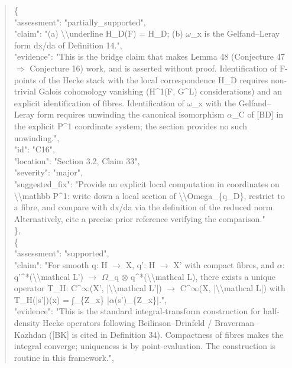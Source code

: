 \documentclass[11pt]{article}
\begin{document}
\begin{quote}
    \{\\
      "assessment": "partially\_supported",\\
      "claim": "(a) \textbackslash{}\textbackslash{}underline H\_D(F) = H\_D; (b) \ensuremath{\omega}\_x is the Gelfand--Leray form dx/da of Definition 14.",\\
      "evidence": "This is the bridge claim that makes Lemma 48 (Conjecture 47 \ensuremath{\Rightarrow} Conjecture 16) work, and is asserted without proof. Identification of F-points of the Hecke stack with the local correspondence H\_D requires non-trivial Galois cohomology vanishing (H\^{}1(F, G\^{}L) considerations) and an explicit identification of fibres. Identification of \ensuremath{\omega}\_x with the Gelfand--Leray form requires unwinding the canonical isomorphism \ensuremath{\alpha}\_C of [BD] in the explicit P\^{}1 coordinate system; the section provides no such unwinding.",\\
      "id": "C16",\\
      "location": "Section 3.2, Claim 33",\\
      "severity": "major",\\
      "suggested\_fix": "Provide an explicit local computation in coordinates on \textbackslash{}\textbackslash{}mathbb P\^{}1: write down a local section of \textbackslash{}\textbackslash{}Omega\_\{q\_D\}, restrict to a fibre, and compare with dx/da via the definition of the reduced norm. Alternatively, cite a precise prior reference verifying the comparison."\\
    \},\\
    \{\\
      "assessment": "supported",\\
      "claim": "For smooth q: H \ensuremath{\to} X, q': H \ensuremath{\to} X' with compact fibres, and \ensuremath{\alpha}: q'\^{}*(\textbackslash{}\textbackslash{}mathcal L') \ensuremath{\to} \ensuremath{\Omega}\_q \ensuremath{\otimes} q\^{}*(\textbackslash{}\textbackslash{}mathcal L), there exists a unique operator T\_H: C\^{}\ensuremath{\infty}(X', |\textbackslash{}\textbackslash{}mathcal L'|) \ensuremath{\to} C\^{}\ensuremath{\infty}(X, |\textbackslash{}\textbackslash{}mathcal L|) with T\_H(|s'|)(x) = ∫\_\{Z\_x\} |\ensuremath{\alpha}(s')\_\{Z\_x\}|.",\\
      "evidence": "This is the standard integral-transform construction for half-density Hecke operators following Beilinson--Drinfeld / Braverman--Kazhdan ([BK] is cited in Definition 34). Compactness of fibres makes the integral converge; uniqueness is by point-evaluation. The construction is routine in this framework.",\\

\end{quote}
\end{document}
